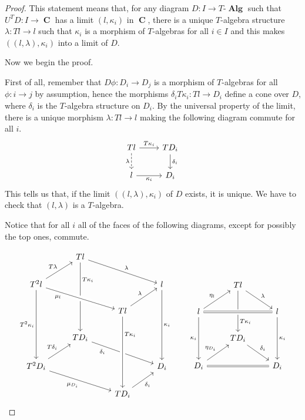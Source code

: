 \documentclass[a4paper,11pt,fullpage,oneside,openany]{amsbook}
\DeclareMathOperator{\Alg}{\mathbf{Alg}}
\DeclareMathOperator{\C}{\mathbf{C}}
\theoremstyle{definition}
\theoremstyle{definition}
\theoremstyle{remark}
\begin{document}
\begin{proof}
	This statement means that, for any diagram $D\colon I\rightarrow T\mbox{-}\Alg$ such that $U^TD\colon I\rightarrow\C$ has a limit $(l,\kappa_i)$ in $\C$, there is a unique $T$-algebra structure $\lambda\colon Tl\rightarrow l$ such that $\kappa_i$ is a morphism of $T$-algebras for all $i\in I$ and this makes $((l,\lambda),\kappa_i)$ into a limit of $D$.
	
	Now we begin the proof.
	
	First of all, remember that $D\phi\colon D_i\rightarrow D_j$ is a morphism of $T$-algebras for all $\phi\colon i\rightarrow j$ by assumption, hence the morphisms $\delta_i T\kappa_i\colon Tl\rightarrow D_i$ define a cone over $D$, where $\delta_i$ is the $T$-algebra structure on $D_i$. By the universal property of the limit, there is a unique morphism $\lambda\colon Tl\rightarrow l$ making the following diagram commute for all $i$.
	\[
	\begin{tikzcd}
	Tl\ar[d, dashed, "\lambda"'] \ar[r, "T\kappa_i"]
	& TD_i\ar[d, "\delta_i"]\\
	 l\ar[r, "\kappa_i"']
	& D_i
	\end{tikzcd}
	\]	
	This tells us that, if the limit $((l,\lambda),\kappa_i)$ of $D$ exists, it is unique. We have to check that $(l,\lambda)$ is a $T$-algebra.
	
	Notice that for all $i$ all of the faces of the following diagrams, except for possibly the top ones, commute.
	
	\[
		\begin{tikzcd}
			& Tl\ar[drr, "\lambda"]\ar[ddd, "T\kappa_i" near start] \\
			T^2l\ar[ur, "T\lambda"]\ar[drr, crossing over, "\mu_l" near start, swap]\ar[ddd, "T^2\kappa_i"']
			&&& l\ar[ddd, "\kappa_i"] \\
			&& Tl\ar[ur, "\lambda"]%
			\\
			& TD_i\ar[drr, swap, "\delta_i" near start] \\
			T^2D_i\ar[ur, "T\delta_i"]\ar[drr, "\mu_{D_i}"']
			&&& D_i \\
			&& TD_i\ar[ur, "\delta_i"'] \ar[from=uuu,crossing over,  "T\kappa_i" near start]
		\end{tikzcd}
		\quad\quad
		\begin{tikzcd}
			& Tl\ar[dr, "\lambda"]\ar[dd, "T\kappa_i" near end] \\
			l\ar[ur, "\eta_l"]\ar[rr, crossing over, equal]\ar[dd, swap, "\kappa_i"]
			&& l\ar[dd, "\kappa_i"] \\
			& TD_i\ar[dr, "\delta_i"] \\
			D_i\ar[ur, "\eta_{D_i}"]\ar[rr, equal]
			&& D_i
		\end{tikzcd}
	\]
	

\end{proof}
\end{document}
